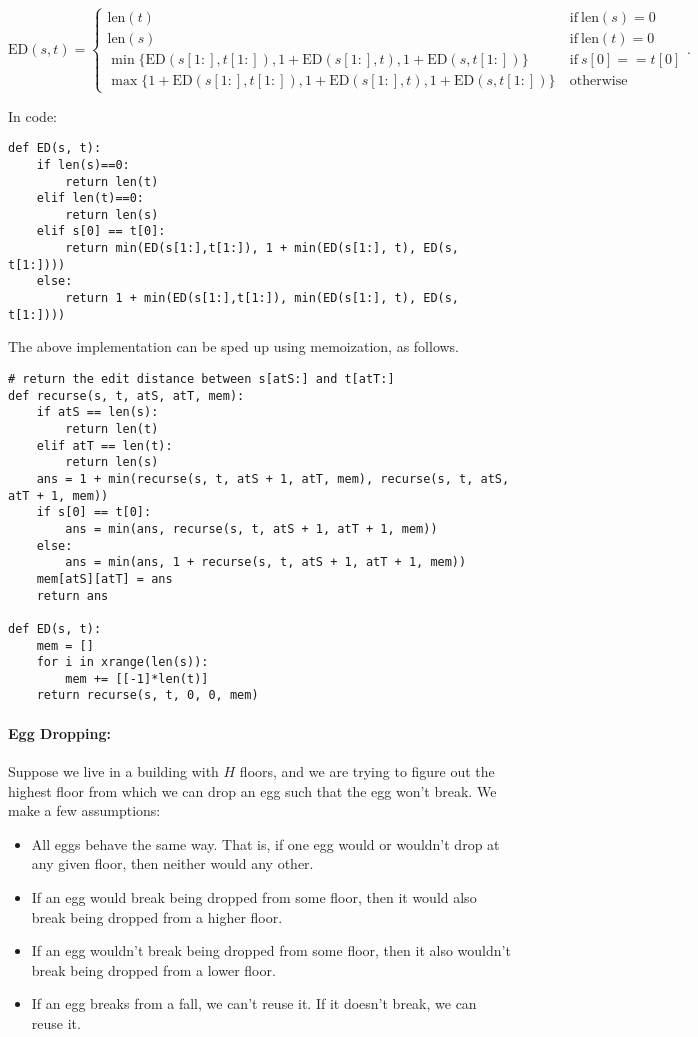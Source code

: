 \documentclass[11pt]{article}
\begin{document}
$$\mathrm{ED}(s,t) =\begin{cases} \mathrm{len}(t) \ &
  \mathrm{if}\ \mathrm{len}(s)=0
\\ 
\mathrm{len}(s) \ &
  \mathrm{if}\ \mathrm{len}(t)=0
\\\min\{\mathrm{ED}(s[1:],t[1:]), 1 + \mathrm{ED}(s[1:],t),
1 + \mathrm{ED}(s,t[1:])\} \ & \mathrm{if}\ s[0] == t[0]\\
\max\{1 + \mathrm{ED}(s[1:],t[1:]), 1+\mathrm{ED}(s[1:],t),
1+\mathrm{ED}(s,t[1:])\}\ &  \mathrm{otherwise} \end{cases} .$$

In code:

\begin{verbatim}
def ED(s, t):
    if len(s)==0:
        return len(t)
    elif len(t)==0:
        return len(s)
    elif s[0] == t[0]:
        return min(ED(s[1:],t[1:]), 1 + min(ED(s[1:], t), ED(s, t[1:])))
    else:
        return 1 + min(ED(s[1:],t[1:]), min(ED(s[1:], t), ED(s, t[1:])))
\end{verbatim}

The above implementation can be sped up using memoization, as follows.

\begin{verbatim}
# return the edit distance between s[atS:] and t[atT:]
def recurse(s, t, atS, atT, mem):
    if atS == len(s):
        return len(t)
    elif atT == len(t):
        return len(s)
    ans = 1 + min(recurse(s, t, atS + 1, atT, mem), recurse(s, t, atS, atT + 1, mem))
    if s[0] == t[0]:
        ans = min(ans, recurse(s, t, atS + 1, atT + 1, mem))
    else:
        ans = min(ans, 1 + recurse(s, t, atS + 1, atT + 1, mem))
    mem[atS][atT] = ans
    return ans

def ED(s, t):
    mem = []
    for i in xrange(len(s)):
        mem += [[-1]*len(t)]
    return recurse(s, t, 0, 0, mem)
\end{verbatim}

\paragraph{Egg Dropping:}
Suppose we live in a building with $H$ floors, and we are trying to
figure out the highest floor from which we can drop an egg such that
the egg won't break.  We make a few assumptions:

\begin{itemize}
\item All eggs behave the same way.  That is, if one egg would or
  wouldn't drop at any given floor, then neither would any other.
\item If an egg would break being dropped from some floor, then it
  would also break being dropped from a higher floor.
\item If an egg wouldn't break being dropped from some floor, then it
  also wouldn't break being dropped from a lower floor.
\item If an egg breaks from a fall, we can't reuse it. If it doesn't
  break, we can reuse it.
\end{itemize}
\end{document}
